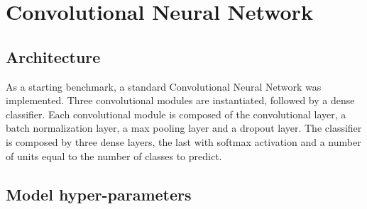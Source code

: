 \section{Convolutional Neural Network}
\label{sec:convolutional_arch}

\subsection{Architecture}

As a starting benchmark, a standard Convolutional Neural Network was implemented.
Three convolutional modules are instantiated, followed by a dense classifier.
Each convolutional module is composed of the convolutional layer, a batch
normalization layer, a max pooling layer and a dropout layer.
The classifier is composed by three dense layers, the last with softmax
activation and a number of units equal to the number of classes to predict.

\subsection{Model hyper-parameters}

